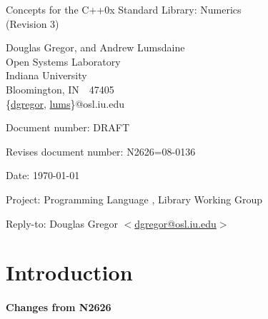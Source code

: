 \documentclass[american,twoside]{book}
\begin{document}
\raggedbottom

\begin{titlepage}
\begin{center}
\huge
Concepts for the C++0x Standard Library: Numerics\\
(Revision 3)

\vspace{0.5in}

\normalsize
Douglas Gregor, and Andrew Lumsdaine \\
Open Systems Laboratory \\
Indiana University \\
Bloomington, IN\ \  47405 \\
\{\href{mailto:dgregor@osl.iu.edu}{dgregor}, \href{mailto:lums@osl.iu.edu}{lums}\}@osl.iu.edu
\end{center}

\vspace{1in}
\par\noindent Document number: DRAFT\vspace{-6pt}
\par\noindent Revises document number: N2626=08-0136\vspace{-6pt}
\par\noindent Date: \today\vspace{-6pt}
\par\noindent Project: Programming Language \Cpp{}, Library Working Group\vspace{-6pt}
\par\noindent Reply-to: Douglas Gregor $<$\href{mailto:dgregor@osl.iu.edu}{dgregor@osl.iu.edu}$>$\vspace{-6pt}

\section*{Introduction}

\paragraph*{Changes from N2626}

\end{titlepage}

\pagestyle{fancy}
\fancyhead[LE,RO]{\textbf{\rightmark}}
\fancyhead[RE]{\textbf{\leftmark\hspace{1em}\thepage}}
\fancyhead[LO]{\textbf{\thepage\hspace{1em}\leftmark}}
\end{document}
